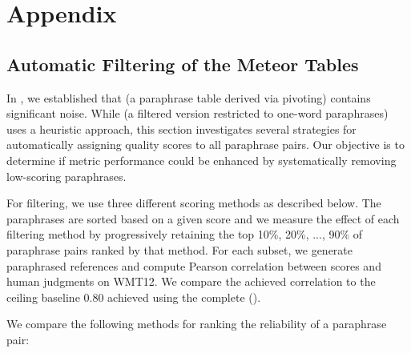 \chapter*{Appendix}

\section*{Automatic Filtering of the Meteor Tables}
\label{filtering-section}

In , we established that \cmpt (a paraphrase table derived via pivoting) contains significant noise. While \fm (a filtered version restricted to one-word paraphrases) uses a heuristic approach, this section investigates several strategies for automatically assigning quality scores to all paraphrase pairs. Our objective is to determine if metric performance could be enhanced by systematically removing low-scoring paraphrases.

For filtering, we use three different scoring methods as described below. The paraphrases are sorted based on a given score and we measure the effect of each filtering method by progressively retaining the top 10\%, 20\%, ..., 90\% of paraphrase pairs ranked by that method. For each subset, we generate paraphrased references and compute Pearson correlation between \bleu scores and human judgments on WMT12. We compare the achieved correlation to the ceiling baseline 0.80 achieved using the complete \fm ().

We compare the following methods for ranking the reliability of a paraphrase pair:

